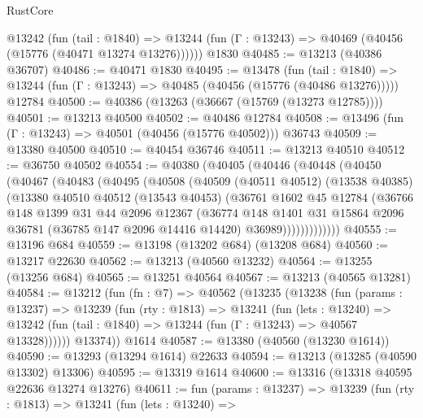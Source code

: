 \begin{lexlean}{RustCore}
\begin{coremodule}
    @13242
      (fun (tail : @1840) =>
      @13244 (fun (Γ : @13243) => @40469 (@40456 (@15776 (@40471 @13274 @13276))))))
    @1830
@40485 := @13213 (@40386 @36707)
@40486 := @40471 @1830
@40495 := @13478
    (fun (tail : @1840) => @13244 (fun (Γ : @13243) => @40485 (@40456 (@15776 (@40486 @13276)))))
    @12784
@40500 := @40386 (@13263 (@36667 (@15769 (@13273 @12785))))
@40501 := @13213 @40500
@40502 := @40486 @12784
@40508 := @13496 (fun (Γ : @13243) => @40501 (@40456 (@15776 @40502))) @36743
@40509 := @13380 @40500
@40510 := @40454 @36746
@40511 := @13213 @40510
@40512 := @36750 @40502
@40554 := @40380
    (@40405
      (@40446
        (@40448
          (@40450
            (@40467
              (@40483
                (@40495
                  (@40508
                    (@40509
                      (@40511 @40512)
                      (@13538 @40385)
                      (@13380
                        @40510
                        @40512
                        (@13543 @40453)
                        (@36761
                          @1602
                          @45
                          @12784
                          (@36766
                            @148
                            @1399
                            @31
                            @44
                            @2096
                            @12367
                            (@36774
                              @148
                              @1401
                              @31
                              @15864
                              @2096
                              @36781
                              (@36785 @147 @2096 @14416 @14420)
                              @36989)))))))))))))
@40555 := @13196 @684
@40559 := @13198 (@13202 @684) (@13208 @684)
@40560 := @13217 @22630
@40562 := @13213 (@40560 @13232)
@40564 := @13255 (@13256 @684)
@40565 := @13251 @40564
@40567 := @13213 (@40565 @13281)
@40584 := @13212
    (fun (fn : @7) =>
    @40562
      (@13235
        (@13238
          (fun (params : @13237) =>
          @13239
            (fun (rty : @1813) =>
            @13241
              (fun (lets : @13240) =>
              @13242 (fun (tail : @1840) => @13244 (fun (Γ : @13243) => @40567 @13328))))))
        @13374))
    @1614
@40587 := @13380 (@40560 (@13230 @1614))
@40590 := @13293 (@13294 @1614) @22633
@40594 := @13213 (@13285 (@40590 @13302) @13306)
@40595 := @13319 @1614
@40600 := @13316 (@13318 @40595 @22636 @13274 @13276)
@40611 := fun (params : @13237) =>
  @13239
    (fun (rty : @1813) =>
    @13241
      (fun (lets : @13240) =>

\end{coremodule}
\end{lexlean}

